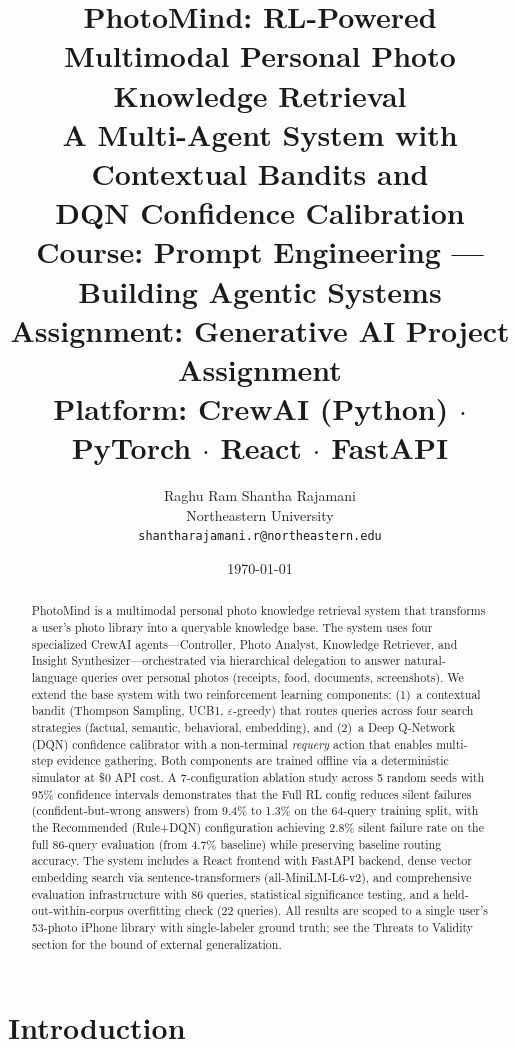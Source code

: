 \documentclass[11pt,letterpaper]{article}
\title{%
  \textbf{PhotoMind: RL-Powered Multimodal Personal Photo\\Knowledge Retrieval}\\[0.5em]
  \large A Multi-Agent System with Contextual Bandits and\\
  DQN Confidence Calibration\\[1em]
  \normalsize
  Course: Prompt Engineering --- Building Agentic Systems\\
  Assignment: Generative AI Project Assignment\\[0.3em]
  Platform: CrewAI (Python) $\cdot$ PyTorch $\cdot$ React $\cdot$ FastAPI
}
\author{
  Raghu Ram Shantha Rajamani\\
  Northeastern University\\
  \texttt{shantharajamani.r@northeastern.edu}
}
\date{\today}
\begin{document}
\maketitle
\thispagestyle{empty}

\begin{abstract}
PhotoMind is a multimodal personal photo knowledge retrieval system that transforms a user's photo library into a queryable knowledge base. The system uses four specialized CrewAI agents---Controller, Photo Analyst, Knowledge Retriever, and Insight Synthesizer---orchestrated via hierarchical delegation to answer natural-language queries over personal photos (receipts, food, documents, screenshots). We extend the base system with two reinforcement learning components: (1)~a contextual bandit (Thompson Sampling, UCB1, $\varepsilon$-greedy) that routes queries across four search strategies (factual, semantic, behavioral, embedding), and (2)~a Deep Q-Network (DQN) confidence calibrator with a non-terminal \textit{requery} action that enables multi-step evidence gathering. Both components are trained offline via a deterministic simulator at \$0 API cost. A 7-configuration ablation study across 5 random seeds with 95\% confidence intervals demonstrates that the Full RL config reduces silent failures (confident-but-wrong answers) from 9.4\% to 1.3\% on the 64-query training split, with the Recommended (Rule+DQN) configuration achieving 2.8\% silent failure rate on the full 86-query evaluation (from 4.7\% baseline) while preserving baseline routing accuracy. The system includes a React frontend with FastAPI backend, dense vector embedding search via sentence-transformers (all-MiniLM-L6-v2), and comprehensive evaluation infrastructure with 86 queries, statistical significance testing, and a held-out-within-corpus overfitting check (22 queries). All results are scoped to a single user's 53-photo iPhone library with single-labeler ground truth; see the Threats to Validity section for the bound of external generalization.
\end{abstract}

\newpage
\tableofcontents
\newpage

\section{Introduction}
\label{sec:introduction}
\end{document}
